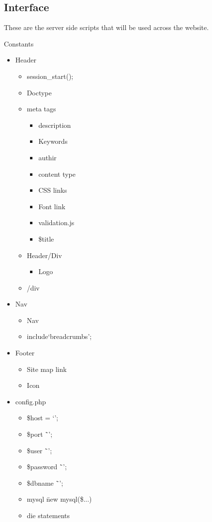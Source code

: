 \subsection{Interface}
	These are the server side scripts that will be used across the website.

	Constants
	\begin{itemize}
		\item Header
		\begin{itemize}
			\item session\_start();
			\item Doctype
			\item meta tags
			\begin{itemize}
				\item description
				\item Keywords
				\item authir
				\item content type
				\item CSS links
				\item Font link
				\item validation.js
				\item \$title
			\end{itemize}
			\item Header/Div
			\begin{itemize}
				\item Logo
			\end{itemize}
			\item /div
		\end{itemize}
		\item Nav
		\begin{itemize}
			\item Nav
			\item include`breadcrumbs';
		\end{itemize}
			
		\item Footer 
		\begin{itemize}
			\item Site map link 
			\item Icon
		\end{itemize}
			
		
		\item config.php
		\begin{itemize}
			\item \$host = `';
			\item \$port \= `';
			\item \$user \= `';
			\item \$password \= `';
			\item \$dbname \= `';
			\item mysql \= new mysql(\$...)
			\item die statements
		\end{itemize}


\end{itemize}
